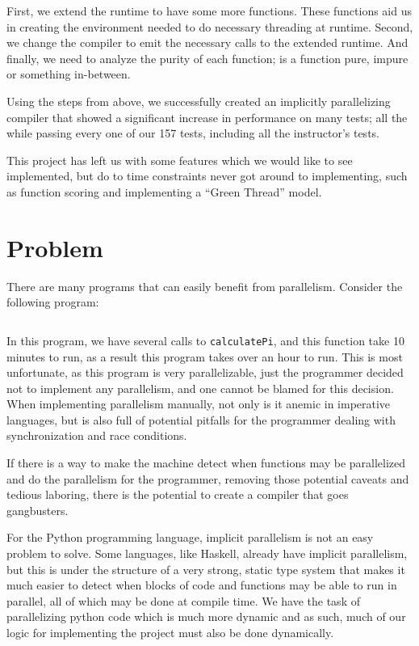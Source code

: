 \documentclass{acm_proc_article-sp}
\begin{document}
First, we extend the runtime to have some more functions. These functions aid us in creating
the environment needed to do necessary threading at runtime. Second, we change the compiler to
emit the necessary calls to the extended runtime. And finally, we need to analyze the purity
of each function; is a function pure, impure or something in-between.

Using the steps from above, we successfully created an implicitly parallelizing compiler that
showed a significant increase in performance on many tests; all the while passing every
one of our 157 tests, including all the instructor's tests.

This project has left us with some features which we would like to see implemented, but do to
time constraints never got around to implementing, such as function scoring and implementing
a ``Green Thread'' model.

\section*{Problem}

There are many programs that can easily benefit from parallelism.
Consider the following program:

\inputminted{python}{pi.py}

In this program, we have several calls to \verb|calculatePi|, and this
function take 10 minutes to run, as a result this program takes over an hour
to run. This is most unfortunate, as this program is very parallelizable, just
the programmer decided not to implement any parallelism, and one cannot be blamed
for this decision. When implementing parallelism manually, not only is it anemic
in imperative languages, but is also full of potential pitfalls for the programmer
dealing with synchronization and race conditions.

If there is a way to make the machine detect when functions may be
parallelized and do the parallelism for the programmer, removing those potential
caveats and tedious laboring, there is the potential to create a
compiler that goes gangbusters.

For the Python programming language, implicit parallelism is not an easy
problem to solve. Some languages, like Haskell, already have implicit
parallelism, but this is under the structure of a very strong, static type
system that makes it much easier to detect when blocks of code and functions
may be able to run in parallel, all of which may be done at compile time. We
have the task of parallelizing python code which is much more dynamic and as
such, much of our logic for implementing the project must also be done
dynamically.
\end{document}
